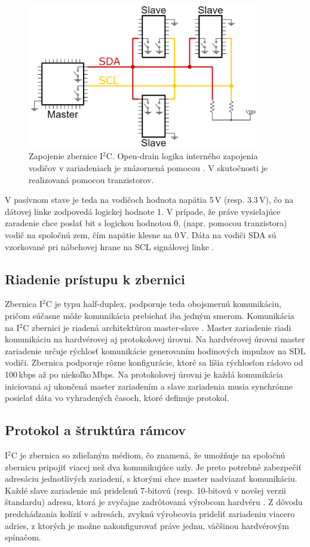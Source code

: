 \begin{figure}
    \centerline{\includegraphics[width=0.9\textwidth]{images/i2cWiring.png}}
    \caption[Zapojenie zbernice I$^2$C]{Zapojenie zbernice I$^2$C. Open-drain logika interného zapojenia vodičov v zariadeniach je znázornená pomocou . V skutočnosti je realizovaná pomocou tranzistorov.}
    \label{obr:i2cWiring}
\end{figure}

V pasívnom stave je teda na vodičoch hodnota napätia 5\,V (resp. 3.3\,V), čo na dátovej linke zodpovedá logickej hodnote 1. V prípade, že práve vysielajúce zaradenie chce poslať bit s logickou hodnotou 0,  (napr. pomocou tranzistora) vodič na spoločnú zem, čím napätie klesne na 0\,V. Dáta na vodiči SDA sú vzorkované pri nábehovej hrane na SCL signálovej linke \cite{i2cBus}.

\subsection{Riadenie prístupu k zbernici}
Zbernica I$^2$C je typu half-duplex, podporuje teda obojsmernú komunikáciu, pričom súčasne môže komunikácia prebiehať iba jedným smerom. Komunikácia na I$^2$C zbernici je riadená architektúrou master-slave \cite{i2cBus}. Master zariadenie riadi komunikáciu na hardvérovej aj protokolovej úrovni. Na hardvérovej úrovni master zariadenie určuje rýchlosť komunikácie generovaním hodinových impulzov na SDL vodiči. Zbernica podporuje rôzne konfigurácie, ktoré sa líšia rýchlosťou rádovo od 100\,kbps až po niekoľko\,Mbps. Na protokolovej úrovni je každá komunikácia iniciovaná aj ukončená master zariadením a slave zariadenia musia synchrónne posielať dáta vo vyhradených časoch, ktoré definuje protokol.

\subsection{Protokol a štruktúra rámcov}
I$^2$C je zbernica so zdieľaným médiom, čo znamená, že umožňuje na spoločnú zbernicu pripojiť viacej než dva komunikujúce uzly. Je preto potrebné zabezpečiť adresáciu jednotlivých zariadení, s ktorými chce master nadviazať komunikáciu. Každé slave zariadenie má pridelenú 7-bitovú (resp. 10-bitovú v novšej verzii štandardu) adresu, ktorá je zvyčajne zadrôtovaná výrobcom hardvéru \cite{i2cBus}. Z dôvodu predchádzania kolízií v adresách, zvyknú výrobcovia prideliť zariadeniu viacero adries, z ktorých je možne nakonfigurovať práve jednu, väčšinou hardvérovým spínačom.

